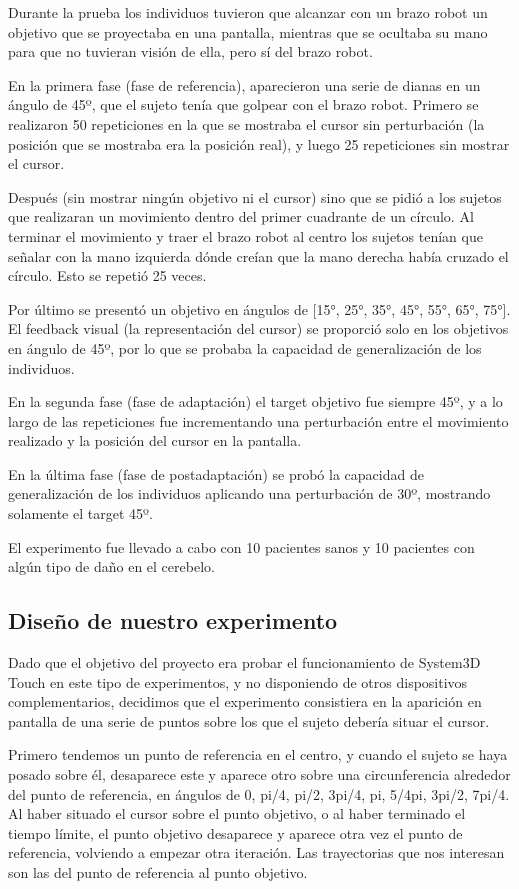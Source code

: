 \documentclass[a4paper,11pt, oneside]{book}
\begin{document}
Durante la prueba los individuos tuvieron que alcanzar con un brazo robot un objetivo que se proyectaba en una pantalla, mientras que se ocultaba su mano para que no tuvieran visión de ella, pero sí del brazo robot. 

En la primera fase (fase de referencia), aparecieron una serie de dianas en un ángulo de 45º, que el sujeto tenía que golpear con el brazo robot. Primero se realizaron 50 repeticiones en la que se mostraba el cursor sin perturbación (la posición que se mostraba era la posición real), y luego 25 repeticiones sin mostrar el cursor.

Después (sin mostrar ningún objetivo ni el cursor) sino que se pidió a los sujetos que realizaran un movimiento dentro del primer cuadrante de un círculo. Al terminar el movimiento y traer el brazo robot al centro los sujetos tenían que señalar con la mano izquierda dónde creían que la mano derecha había cruzado el círculo. Esto se repetió 25 veces.

Por último se presentó un objetivo en ángulos de [15°, 25°, 35°, 45°, 55°, 65°, 75°]. El feedback visual (la representación del cursor) se proporció solo en los objetivos en ángulo de 45º, por lo que se probaba la capacidad de generalización de los individuos.

En la segunda fase (fase de adaptación) el target objetivo fue siempre 45º, y a lo largo de las repeticiones fue incrementando una perturbación entre el movimiento realizado y la posición del cursor en la pantalla. 

En la última fase (fase de postadaptación) se probó la capacidad de generalización de los individuos aplicando una perturbación de 30º, mostrando solamente el target 45º.

El experimento fue llevado a cabo con 10 pacientes sanos y 10 pacientes con algún tipo de daño en el cerebelo.

\subsection{Diseño de nuestro experimento}

Dado que el objetivo del proyecto era probar el funcionamiento de System3D Touch en este tipo de experimentos, y no disponiendo de otros dispositivos complementarios, decidimos que el experimento consistiera en la aparición en pantalla de una serie de puntos sobre los que el sujeto debería situar el cursor.

Primero tendemos un punto de referencia en el centro, y cuando el sujeto se haya posado sobre él, desaparece este y aparece otro sobre una circunferencia alrededor del punto de referencia, en ángulos de 0, pi/4, pi/2, 3pi/4, pi, 5/4pi, 3pi/2, 7pi/4. Al haber situado el cursor sobre el punto objetivo, o al haber terminado el tiempo límite, el punto objetivo desaparece y aparece otra vez el punto de referencia, volviendo a empezar otra iteración. Las trayectorias que nos interesan son las del punto de referencia al punto objetivo.
\end{document}
